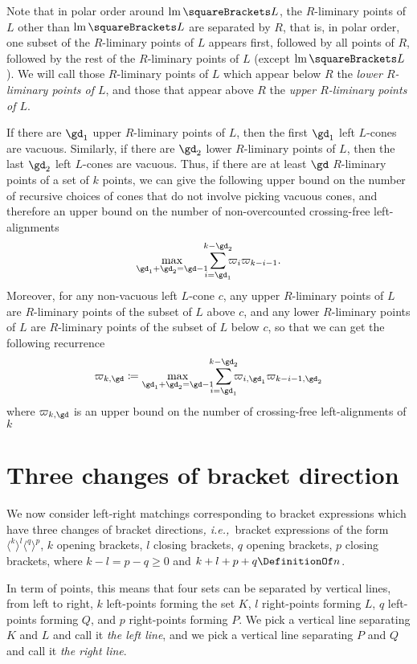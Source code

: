 \documentclass[10pt, a4paper, twoside]{basestyle}
\newcommand{\idest}{\emph{, i.e.,\ }}
\DeclareMathOperator{\leftmost}{lm}
\begin{document}
Note that in polar order around $\leftmost\of L$, the $R$-liminary points of $L$ other than $\leftmost\of L$ are separated by
$R$, that is, in polar order, one subset of the $R$-liminary points of $L$ appears first, followed by
all points of $R$, followed by the rest of the $R$-liminary points of $L$ (except $\leftmost\of L$).
We will call those $R$-liminary points of $L$ which appear below $R$ the \emph{lower $R$-liminary points of $L$},
and those that appear above $R$ the \emph{upper $R$-liminary points of $L$}.

If there are $\gd_1$ upper $R$-liminary points of $L$, then the first $\gd_1$ left $L$-cones are vacuous.
Similarly, if there are $\gd_2$ lower $R$-liminary points of $L$, then the last
$\gd_2$ left $L$-cones are vacuous.
Thus, if there are at least
$\gd$ $R$-liminary points of a set of $k$ points, we can give the following upper bound on the number of recursive
choices of cones that do not involve picking
vacuous cones, and therefore an upper bound on the number of non-overcounted crossing-free left-alignments
\[\max_{\gd_1+\gd_2=\gd-1}\sum{i=\gd_1}[k-\gd_2]\varpi_{i}\varpi_{k-i-1}\text.\]
Moreover, for any non-vacuous left $L$-cone $c$, any upper $R$-liminary points of $L$ are $R$-liminary points of the
subset of $L$ above $c$, and any lower $R$-liminary points of $L$ are $R$-liminary points of the
subset of $L$ below $c$, so that we can get the following recurrence
\[\varpi_{k,\gd}\DefineAs\max_{\gd_1+\gd_2=\gd-1}\sum{i=\gd_1}[k-\gd_2]\varpi_{i,\gd_1}\varpi_{k-i-1,\gd_2}\]
where $\varpi_{k,\gd}$ is an upper bound on the number of crossing-free left-alignments of $k$
\section{Three changes of bracket direction}
We now consider left-right matchings corresponding to bracket expressions which have three
changes of bracket directions\idest bracket expressions of the form
$\langle^k\rangle^l\langle^q\rangle^p$,
$k$ opening brackets, $l$ closing brackets, $q$ opening brackets, $p$ closing brackets, where
$k-l=p-q\geq 0$ and $k+l+p+q\DefinitionOf n$.

In term of points, this means that four sets can be separated by vertical lines, from left
to right, $k$ left-points forming the set $K$, $l$ right-points forming $L$, $q$ left-points
forming $Q$, and $p$ right-points forming $P$.
We pick a vertical line separating $K$ and $L$ and call it \emph{the left line}, and we pick
a vertical line separating $P$ and $Q$ and call it \emph{the right line}.
\end{document}
